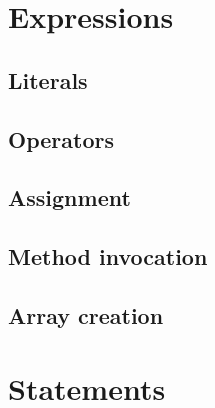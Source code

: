 \section{Expressions}

\subsection{Literals}

\subsection{Operators}

\subsection{Assignment}

\subsection{Method invocation}

\subsection{Array creation}


\section{Statements}